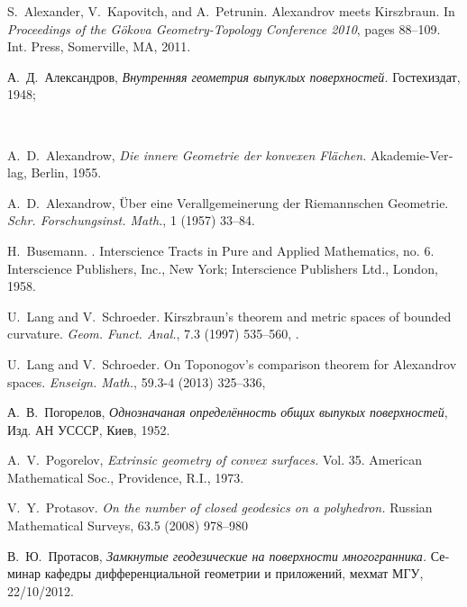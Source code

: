 \documentclass[oneside,a4paper, 12pt]{article}
\begin{document}
\begin{thebibliography}{52}

S.~Alexander, V.~Kapovitch, and A.~Petrunin.
\newblock Alexandrov meets {K}irszbraun.
\newblock In {\em Proceedings of the {G}\"okova {G}eometry-{T}opology
  {C}onference 2010}, pages 88--109. Int. Press, Somerville, MA, 2011.

\begin{otherlanguage}{russian}
А.~Д.~Александров,
\emph{Внутренняя геометрия выпуклых поверхностей.} 
Гостехиздат, 1948;
\end{otherlanguage}\\
\begin{otherlanguage}{german}
A.~D.~Alexandrow, \emph{Die innere Geometrie der konvexen Fl\"achen.} 
Akademie-Verlag, Berlin, 1955.
\end{otherlanguage}

A.~D.~Alexandrow,
\"Uber eine Verallgemeinerung der Riemannschen Geometrie.
\emph{Schr. Forschungsinst. Math.},
1 (1957) 33--84.

H.~Busemann.
.
\newblock Interscience Tracts in Pure and Applied Mathematics, no. 6.
  Interscience Publishers, Inc., New York; Interscience Publishers Ltd.,
  London, 1958.

U.~Lang and V.~Schroeder.
\newblock Kirszbraun's theorem and metric spaces of bounded curvature.
\newblock \emph{Geom. Funct. Anal.}, 7.3 (1997) 535--560, .

U.~Lang and V.~Schroeder.
\newblock On {T}oponogov's comparison theorem for {A}lexandrov spaces.
\newblock \emph{Enseign. Math.}, 59.3-4 (2013) 325--336,

\begin{otherlanguage}{russian}
А.~В.~Погорелов,
\emph{Однозначаная определённость общих выпукых поверхностей},
Изд. АН УСССР, Киев, 1952.
\end{otherlanguage}

A.~V.~Pogorelov, \emph{Extrinsic geometry of convex surfaces.} 
Vol. 35. American Mathematical Soc., Providence, R.I., 1973.

V.~Y.~Protasov.
\newblock \emph{On the number of closed geodesics on a polyhedron.}
\newblock Russian Mathematical Surveys, 63.5 (2008) 978--980

\begin{otherlanguage}{russian}
В.~Ю.~Протасов,
\emph{Замкнутые геодезические на поверхности многогранника.}
Семинар кафедры дифференциальной геометрии и приложений, мехмат МГУ, 22/10/2012.
\end{otherlanguage}


\end{thebibliography}
\Addresses
\end{document}
